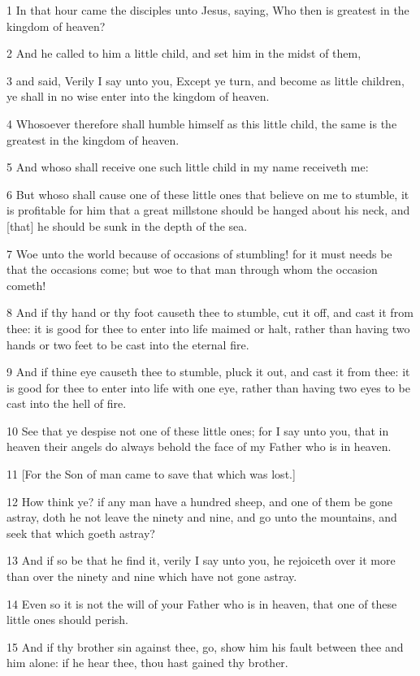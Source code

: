 \par 1 In that hour came the disciples unto Jesus, saying, Who then is greatest in the kingdom of heaven?
\par 2 And he called to him a little child, and set him in the midst of them,
\par 3 and said, Verily I say unto you, Except ye turn, and become as little children, ye shall in no wise enter into the kingdom of heaven.
\par 4 Whosoever therefore shall humble himself as this little child, the same is the greatest in the kingdom of heaven.
\par 5 And whoso shall receive one such little child in my name receiveth me:
\par 6 But whoso shall cause one of these little ones that believe on me to stumble, it is profitable for him that a great millstone should be hanged about his neck, and [that] he should be sunk in the depth of the sea.
\par 7 Woe unto the world because of occasions of stumbling! for it must needs be that the occasions come; but woe to that man through whom the occasion cometh!
\par 8 And if thy hand or thy foot causeth thee to stumble, cut it off, and cast it from thee: it is good for thee to enter into life maimed or halt, rather than having two hands or two feet to be cast into the eternal fire.
\par 9 And if thine eye causeth thee to stumble, pluck it out, and cast it from thee: it is good for thee to enter into life with one eye, rather than having two eyes to be cast into the hell of fire.
\par 10 See that ye despise not one of these little ones; for I say unto you, that in heaven their angels do always behold the face of my Father who is in heaven.
\par 11 [For the Son of man came to save that which was lost.]
\par 12 How think ye? if any man have a hundred sheep, and one of them be gone astray, doth he not leave the ninety and nine, and go unto the mountains, and seek that which goeth astray?
\par 13 And if so be that he find it, verily I say unto you, he rejoiceth over it more than over the ninety and nine which have not gone astray.
\par 14 Even so it is not the will of your Father who is in heaven, that one of these little ones should perish.
\par 15 And if thy brother sin against thee, go, show him his fault between thee and him alone: if he hear thee, thou hast gained thy brother.
